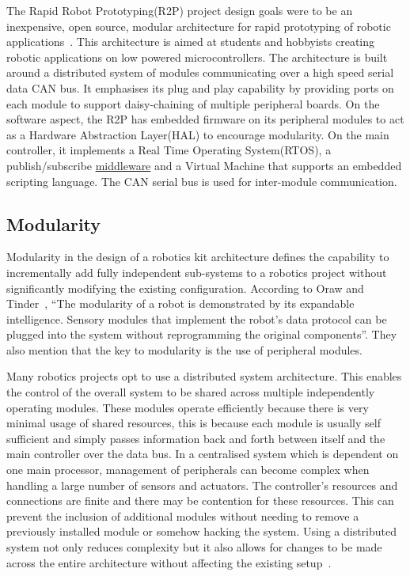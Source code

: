 The Rapid Robot Prototyping(R2P) project design goals were to be an inexpensive, open source, modular architecture for rapid prototyping of robotic applications~\parencite{r2p}. This architecture is aimed at students and hobbyists creating robotic applications on low powered microcontrollers. The architecture is built around a distributed system of modules communicating over a high speed serial data CAN bus. It emphasises its plug and play capability by providing ports on each module to support daisy-chaining of multiple peripheral boards. On the software aspect, the R2P has embedded firmware on its peripheral modules to act as a Hardware Abstraction Layer(HAL) to encourage modularity. On the main controller, it implements a Real Time Operating System(RTOS), a publish/subscribe \hyperref[ssub:middleware]{middleware} and a Virtual Machine that supports an embedded scripting language. The CAN serial bus is used for inter-module communication. 
%
%



\subsection{Modularity} %
\label{sub:modularity}
Modularity in the design of a robotics kit architecture defines the capability to incrementally add fully independent sub-systems to a robotics project without significantly modifying the existing configuration. According to Oraw and Tinder~\parencite{mars}, ``The modularity of a robot is demonstrated by its expandable intelligence. Sensory modules that implement the robot's data protocol can be plugged into the system without reprogramming the original components''. They also mention that the key to modularity is the use of peripheral modules. 

Many robotics projects opt to use a distributed system architecture. This enables the control of the overall system to be shared across multiple independently operating modules. These modules operate efficiently because there is very minimal usage of shared resources, this is because each module is usually self sufficient and simply passes information back and forth between itself and the main controller over the data bus. In a centralised system which is dependent on one main processor, management of peripherals can become complex when handling a large number of sensors and actuators. The controller's resources and connections are finite and there may be contention for these resources. This can prevent the inclusion of additional modules without needing to remove a previously installed module or somehow hacking the system.  Using a distributed system not only reduces complexity but it also allows for changes to be made across the entire architecture without affecting the existing setup~\parencite{avcithesis}.

